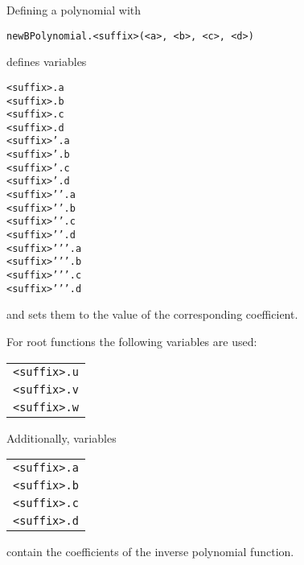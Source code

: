 \documentclass{article}
\newcommand*{\cmd}[1]{\texttt{#1}}
\begin{document}
Defining a polynomial with
\begin{center}
  \cmd{newBPolynomial.<suffix>(<a>, <b>, <c>, <d>)}
\end{center}
defines variables
\begin{center}
  \begin{minipage}{.77\textwidth}
  \begin{multicols}{2}
    \cmd{<suffix>.a} \\
    \cmd{<suffix>.b} \\
    \cmd{<suffix>.c} \\
    \cmd{<suffix>.d} \\
    \cmd{<suffix>'.a} \\
    \cmd{<suffix>'.b} \\
    \cmd{<suffix>'.c} \\
    \cmd{<suffix>'.d} \\
    \cmd{<suffix>'{}'.a} \\
    \cmd{<suffix>'{}'.b} \\
    \cmd{<suffix>'{}'.c} \\
    \cmd{<suffix>'{}'.d} \\
    \cmd{<suffix>'{}'{}'.a} \\
    \cmd{<suffix>'{}'{}'.b} \\
    \cmd{<suffix>'{}'{}'.c} \\
    \cmd{<suffix>'{}'{}'.d}
  \end{multicols}
\end{minipage}
\end{center}
and sets them to the value of the corresponding coefficient.

For root functions the following variables are used:
\begin{center}
  \begin{tabular}{l}
    \cmd{<suffix>.u} \\
    \cmd{<suffix>.v} \\
    \cmd{<suffix>.w} \\
  \end{tabular}
\end{center}

Additionally, variables
\begin{center}
  \begin{tabular}{l}
    \cmd{<suffix>.a} \\
    \cmd{<suffix>.b} \\
    \cmd{<suffix>.c} \\
    \cmd{<suffix>.d} \\
  \end{tabular}
\end{center}
contain the coefficients of the inverse polynomial function.
\end{document}
